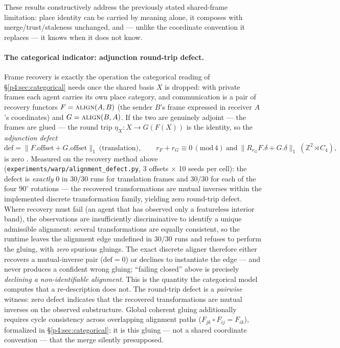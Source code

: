 \documentclass{article}
\begin{document}
These results constructively address the previously stated
shared-frame limitation: place identity can be carried by
meaning alone, it composes with merge/trust/staleness unchanged, and
--- unlike the coordinate convention it replaces --- it knows when it
does not know.

\paragraph{The categorical indicator: adjunction round-trip defect.}
Frame recovery is exactly the operation the categorical reading of
\S\ref{p4:sec:categorical} needs once the shared basis $X$ is dropped: with
private frames each agent carries its own place category, and
communication is a pair of recovery functors $F=\textsc{align}(A,B)$
(the sender $B$'s frame expressed in receiver $A$'s coordinates) and
$G=\textsc{align}(B,A)$. If the two are genuinely adjoint --- the frames
are glued --- the round trip $\eta_X: X\to G(F(X))$ is the identity, so
the \emph{adjunction defect}
\[
\mathrm{def}=\lVert F.\mathrm{offset}+G.\mathrm{offset}\rVert_1
\ \text{(translation)},\qquad
r_F{+}r_G\equiv 0\,(\mathrm{mod}\,4)\ \text{and}\
\lVert R_{r_G}F.\delta+G.\delta\rVert_1\ (\mathbb{Z}^2\rtimes C_4),
\]
is zero \citep{maclane1998categories}. Measured on the recovery method
above (\texttt{experiments/warp/alignment\_defect.py}, 3 offsets
$\times$ 10 seeds per cell): the defect is \emph{exactly} $0$ in $30/30$
runs for translation frames and $30/30$ for each of the four $90^\circ$
rotations --- the recovered transformations are mutual inverses within
the implemented discrete transformation family, yielding zero
round-trip defect. Where recovery must fail (an agent that has observed
only a featureless interior band), the observations are insufficiently
discriminative to identify a unique admissible alignment: several
transformations are equally consistent, so the runtime leaves the
alignment edge undefined in $30/30$ runs and refuses to perform the
gluing, with \emph{zero} spurious gluings. The exact discrete aligner
therefore either recovers a mutual-inverse pair ($\mathrm{def}{=}0$) or
declines to instantiate the edge --- and never produces a confident
wrong gluing; ``failing closed'' above is precisely
\emph{declining a non-identifiable alignment}. This is the quantity the categorical
model computes that a re-description does not. The round-trip defect is
a \emph{pairwise} witness: zero defect indicates that the recovered
transformations are mutual inverses on the observed substructure.
Global coherent gluing additionally requires cycle consistency across
overlapping alignment paths ($F_{jk}\circ F_{ij}=F_{ik}$), formalized
in \S\ref{p4:sec:categorical}; it is this gluing --- not a shared
coordinate convention --- that the merge silently presupposed.
\end{document}
